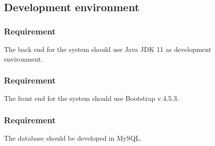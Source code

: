 \documentclass{article}
\begin{document}
\subsection{Development environment}
\subsubsection{Requirement}
The back end for the system should use Java JDK 11 as development environment.

\subsubsection{Requirement}
The front end for the system should use Bootstrap v.4.5.3.

\subsubsection{Requirement}
The database should be developed in MySQL.
\end{document}
